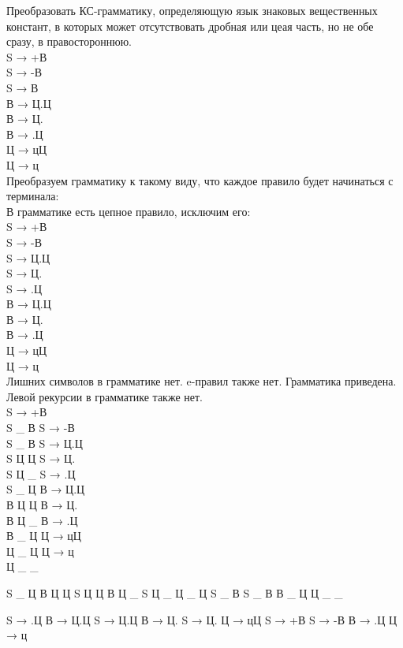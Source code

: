 \documentclass[a4paper,14pt]{extarticle}
\begin{document}

Преобразовать КС-грамматику, определяющую язык знаковых вещественных
констант, в которых может отсутствовать дробная или цеая часть,
но не обе сразу, в правостороннюю.\\


S → +В\\
S → -В\\
S → В\\
В → Ц.Ц\\
В → Ц.\\
В → .Ц\\
Ц → цЦ\\
Ц → ц\\

Преобразуем грамматику к такому виду, что каждое правило будет начинаться с 
терминала:\\
В грамматике есть цепное правило, исключим его:\\

S → +В\\   
S → -В\\
S → Ц.Ц\\
S → Ц.\\
S → .Ц\\
В → Ц.Ц\\
В → Ц.\\
В → .Ц\\
Ц → цЦ\\
Ц → ц\\

Лишних символов в грамматике нет. e-правил также нет. Грамматика приведена.
Левой рекурсии в грамматике также нет.\\

\iffalse
S → +В\\   S _ В
S → -В\\   S _ В
S → Ц.Ц\\  S Ц Ц
S → Ц.\\   S Ц _
S → .Ц\\   S _ Ц
В → Ц.Ц\\  В Ц Ц
В → Ц.\\   В Ц _
В → .Ц\\   В _ Ц
Ц → цЦ\\   Ц _ Ц
Ц → ц\\    Ц _ _



S _ Ц
В Ц Ц
S Ц Ц
В Ц _
S Ц _
Ц _ Ц
S _ В
S _ В
В _ Ц
Ц _ _


S → .Ц
В → Ц.Ц
S → Ц.Ц
В → Ц.
S → Ц.
Ц → цЦ
S → +В
S → -В
В → .Ц
Ц → ц
\end{document}

